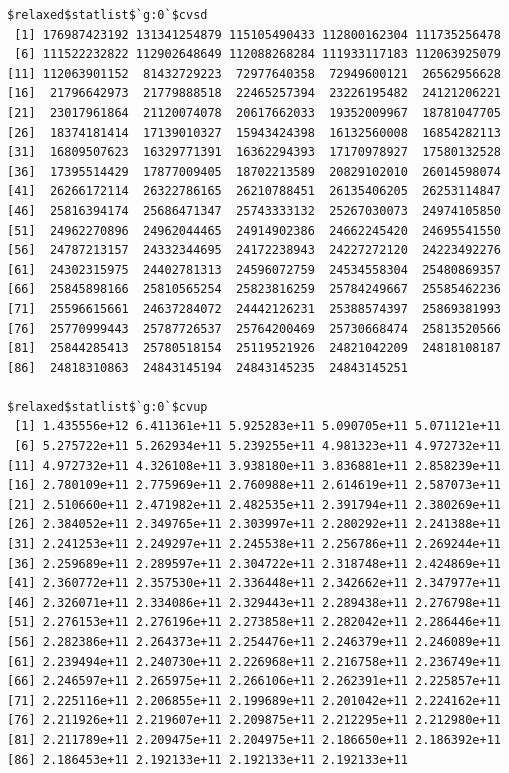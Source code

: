 \documentclass[
]{article}
\begin{document}
\begin{verbatim}
$relaxed$statlist$`g:0`$cvsd
 [1] 176987423192 131341254879 115105490433 112800162304 111735256478
 [6] 111522232822 112902648649 112088268284 111933117183 112063925079
[11] 112063901152  81432729223  72977640358  72949600121  26562956628
[16]  21796642973  21779888518  22465257394  23226195482  24121206221
[21]  23017961864  21120074078  20617662033  19352009967  18781047705
[26]  18374181414  17139010327  15943424398  16132560008  16854282113
[31]  16809507623  16329771391  16362294393  17170978927  17580132528
[36]  17395514429  17877009405  18702213589  20829102010  26014598074
[41]  26266172114  26322786165  26210788451  26135406205  26253114847
[46]  25816394174  25686471347  25743333132  25267030073  24974105850
[51]  24962270896  24962044465  24914902386  24662245420  24695541550
[56]  24787213157  24332344695  24172238943  24227272120  24223492276
[61]  24302315975  24402781313  24596072759  24534558304  25480869357
[66]  25845898166  25810565254  25823816259  25784249667  25585462236
[71]  25596615661  24637284072  24442126231  25388574397  25869381993
[76]  25770999443  25787726537  25764200469  25730668474  25813520566
[81]  25844285413  25780518154  25119521926  24821042209  24818108187
[86]  24818310863  24843145194  24843145235  24843145251

$relaxed$statlist$`g:0`$cvup
 [1] 1.435556e+12 6.411361e+11 5.925283e+11 5.090705e+11 5.071121e+11
 [6] 5.275722e+11 5.262934e+11 5.239255e+11 4.981323e+11 4.972732e+11
[11] 4.972732e+11 4.326108e+11 3.938180e+11 3.836881e+11 2.858239e+11
[16] 2.780109e+11 2.775969e+11 2.760988e+11 2.614619e+11 2.587073e+11
[21] 2.510660e+11 2.471982e+11 2.482535e+11 2.391794e+11 2.380269e+11
[26] 2.384052e+11 2.349765e+11 2.303997e+11 2.280292e+11 2.241388e+11
[31] 2.241253e+11 2.249297e+11 2.245538e+11 2.256786e+11 2.269244e+11
[36] 2.259689e+11 2.289597e+11 2.304722e+11 2.318748e+11 2.424869e+11
[41] 2.360772e+11 2.357530e+11 2.336448e+11 2.342662e+11 2.347977e+11
[46] 2.326071e+11 2.334086e+11 2.329443e+11 2.289438e+11 2.276798e+11
[51] 2.276153e+11 2.276196e+11 2.273858e+11 2.282042e+11 2.286446e+11
[56] 2.282386e+11 2.264373e+11 2.254476e+11 2.246379e+11 2.246089e+11
[61] 2.239494e+11 2.240730e+11 2.226968e+11 2.216758e+11 2.236749e+11
[66] 2.246597e+11 2.265975e+11 2.266106e+11 2.262391e+11 2.225857e+11
[71] 2.225116e+11 2.206855e+11 2.199689e+11 2.201042e+11 2.224162e+11
[76] 2.211926e+11 2.219607e+11 2.209875e+11 2.212295e+11 2.212980e+11
[81] 2.211789e+11 2.209475e+11 2.204975e+11 2.186650e+11 2.186392e+11
[86] 2.186453e+11 2.192133e+11 2.192133e+11 2.192133e+11


\end{verbatim}
\end{document}
